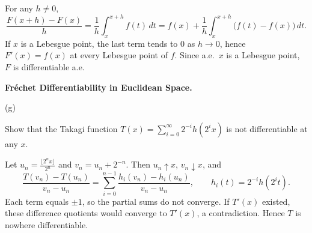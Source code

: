 \begin{solution}
For any $h\neq0$,
\[
\frac{F(x+h)-F(x)}{h}
=\frac1h\int_x^{x+h} f(t)\,dt
=f(x)+\frac1h\int_x^{x+h}\!\bigl(f(t)-f(x)\bigr)\,dt.
\]
If $x$ is a Lebesgue point, the last term tends to $0$ as $h\to0$, hence $F'(x)=f(x)$ at every
Lebesgue point of $f$. Since a.e.\ $x$ is a Lebesgue point, $F$ is differentiable a.e.
\end{solution}

\begin{problem}[CP-II-0252]
\label{prob:cp-ii-0252}
\textbf{Fréchet Differentiability in Euclidean Space.}

\hspace*{1.5em}(g)

Show that the Takagi function $T(x)=\sum_{i=0}^{\infty}2^{-i}h(2^i x)$ is not differentiable at any $x$.
\end{problem}

\begin{solution}
Let $u_n=\frac{\lfloor 2^n x\rfloor}{2^n}$ and $v_n=u_n+2^{-n}$. Then $u_n\uparrow x$, $v_n\downarrow x$, and
\[
\frac{T(v_n)-T(u_n)}{v_n-u_n}=\sum_{i=0}^{n-1}\frac{h_i(v_n)-h_i(u_n)}{v_n-u_n},\qquad h_i(t)=2^{-i}h(2^i t).
\]
Each term equals $\pm1$, so the partial sums do not converge. If $T'(x)$ existed, these difference quotients
would converge to $T'(x)$, a contradiction. Hence $T$ is nowhere differentiable.
\end{solution}


